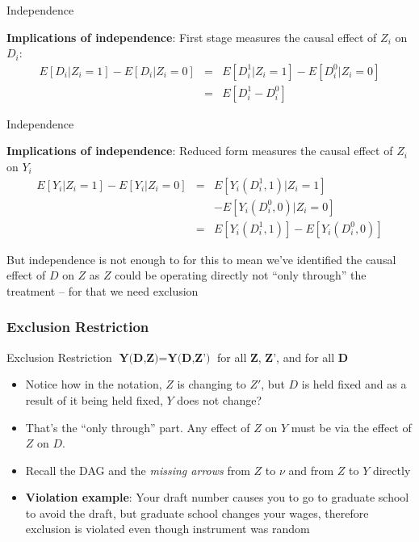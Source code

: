 \documentclass{beamer}
\begin{document}
\begin{frame}{Independence}

		 \textbf{Implications of independence}: First stage measures the causal effect of $Z_i$ on $D_i$:
			\begin{eqnarray*}
			E[D_i|Z_i=1] - E[D_i|Z_i=0] &=& E[D^1_{i} | Z_i = 1] - E[D^0_{i}|Z_i = 0] \\
			&=& E[D^1_{i} - D^0_{i}]
			\end{eqnarray*}

\end{frame}

\begin{frame}{Independence}

			 \textbf{Implications of independence}: Reduced form measures the causal effect of $Z_i$ on $Y_i$
			\begin{eqnarray*}
			E[Y_i | Z_i=1] - E[Y_i | Z_i=0] &=& E[Y_i(D^1_{i},1)|Z_i = 1] \\
			&& - E[Y_i(D^0_{i},0) | Z_i = 0] \\
			&=&E[Y_i(D^1_{i},1)] - E[Y_i(D^0_{i},0)]
			\end{eqnarray*}
			
			\bigskip
			
			But independence is not enough to for this to mean we've identified the causal effect of $D$ on $Z$ as $Z$ could be operating directly not ``only through'' the treatment -- for that we need exclusion
\end{frame}

\begin{frame}[plain]
\frametitle{Exclusion Restriction}

	\begin{block}{Exclusion Restriction}
	$\textbf{Y(D,Z)}=\textbf{Y(D,Z')}$ for all $\textbf{Z}$, $\textbf{Z'}$, and for all $\textbf{D}$
	\end{block}
	
\begin{itemize}
\item Notice how in the notation, $Z$ is changing to $Z'$, but $D$ is held fixed and as a result of it being held fixed, $Y$ does not change?
\item  That's the ``only through'' part. Any effect of $Z$ on $Y$ must be via the effect of $Z$ on $D$.
\item Recall the DAG and the \emph{missing arrows} from $Z$ to $\nu$ and from $Z$ to $Y$ directly
\item \textbf{Violation example}:  Your draft number causes you to go to graduate school to avoid the draft, but graduate school changes your wages, therefore exclusion is violated even though instrument was random
\end{itemize}
	
\end{frame}
\end{document}
